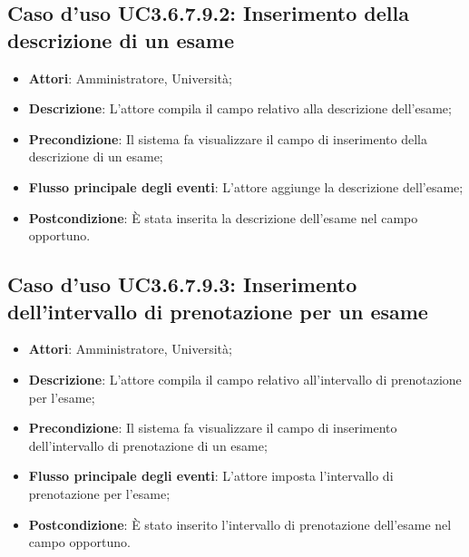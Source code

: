\subsection{Caso d'uso \texorpdfstring{UC3.6.7.9.2}{UC3.6.7.9.2}: Inserimento della descrizione di un esame}
\begin{itemize}
\item \textbf{Attori}: Amministratore, Università;
\item \textbf{Descrizione}: L'attore compila il campo relativo alla descrizione dell’esame;

\item \textbf{Precondizione}: Il sistema fa visualizzare il campo di inserimento della descrizione di un esame;
\item \textbf{Flusso principale degli eventi}: L'attore aggiunge la descrizione dell’esame;

\item \textbf{Postcondizione}: È stata inserita la descrizione dell'esame nel campo opportuno.

\end{itemize}
\subsection{Caso d'uso \texorpdfstring{UC3.6.7.9.3}{UC3.6.7.9.3}: Inserimento dell’intervallo di prenotazione per un esame}
\begin{itemize}
\item \textbf{Attori}: Amministratore, Università;
\item \textbf{Descrizione}: L'attore compila il campo relativo all'intervallo di prenotazione per l'esame;

\item \textbf{Precondizione}: Il sistema fa visualizzare il campo di inserimento dell'intervallo di prenotazione di un esame;

\item \textbf{Flusso principale degli eventi}: L'attore imposta l'intervallo di prenotazione per l'esame;

\item \textbf{Postcondizione}: È stato inserito l'intervallo di prenotazione dell'esame nel campo opportuno.

\end{itemize}
